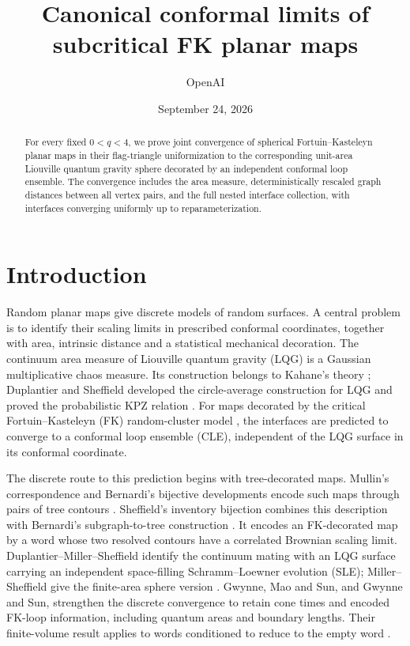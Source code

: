 \documentclass[11pt]{article}
\title{Canonical conformal limits of subcritical FK planar maps}
\author{OpenAI}
\date{September 24, 2026}
\numberwithin{equation}{section}
\theoremstyle{definition}
\theoremstyle{remark}
\newcommand{\1}{\mathbf 1}
\begin{document}
\begin{abstract}
For every fixed $0<q<4$, we prove joint convergence of spherical
Fortuin--Kasteleyn planar maps in their flag-triangle uniformization to
the corresponding unit-area Liouville quantum gravity sphere decorated
by an independent conformal loop ensemble. The convergence includes
the area measure, deterministically rescaled graph distances between all
vertex pairs, and the full nested interface collection, with interfaces
converging uniformly up to reparameterization.
\end{abstract}
\tableofcontents
\section{Introduction}\label{intro:section}

Random planar maps give discrete models of random surfaces. A central
problem is to identify their scaling limits in prescribed conformal
coordinates, together with area, intrinsic distance and a statistical
mechanical decoration. The continuum area measure of Liouville quantum
gravity (LQG) is a Gaussian multiplicative chaos measure. Its construction
belongs to Kahane's theory \citep{KahaneChaos1985}; Duplantier and
Sheffield developed the circle-average construction for LQG and proved
the probabilistic KPZ relation \citep{DuplantierSheffieldKPZ2011}.
For maps decorated by the critical Fortuin--Kasteleyn (FK)
random-cluster model \citep{FortuinKasteleyn1972}, the interfaces are
predicted to converge to a conformal loop ensemble (CLE), independent
of the LQG surface in its conformal coordinate.

The discrete route to this prediction begins with tree-decorated maps.
Mullin's correspondence and Bernardi's bijective developments encode
such maps through pairs of tree contours
\citep{Mullin1967,Bernardi2007}. Sheffield's inventory bijection combines
this description with Bernardi's subgraph-to-tree construction
\citep{Bernardi2008Subgraphs,SheffieldInventory}. It encodes an
FK-decorated map by a word whose two resolved contours have a correlated
Brownian scaling limit. Duplantier--Miller--Sheffield identify the
continuum mating with an LQG surface carrying an independent
space-filling Schramm--Loewner evolution (SLE); Miller--Sheffield give
the finite-area sphere version \citep{DMSMating,MillerSheffieldSphere}.
Gwynne, Mao and Sun, and Gwynne and Sun, strengthen the discrete
convergence to retain cone times and encoded FK-loop information,
including quantum areas and boundary lengths. Their finite-volume
result applies to words conditioned to reduce to the empty word
\citep{GwynneMaoSunFKI,GwynneSunFKII,GwynneSunFKIII}.
\end{document}
